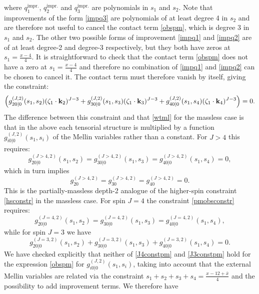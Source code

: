 \documentclass[11pt,a4paper]{article}
\begin{document}
where $q^{\text{impr.}}_1$, $q^{\text{impr.}}_2$ and $q^{\text{impr.}}_3$ are polynomials in $s_1$ and $s_2$. Note that improvements of the form \eqref{impq3} are  polynomials of at least degree 4 in $s_2$ and are therefore not useful to cancel the contact term \eqref{obspm}, which is degree 3 in $s_1$ and $s_2$. The other two possible forms of improvement \eqref{impq1} and \eqref{impq2} are of at least degree-2 and degree-3 respectively, but they both have zeros at $s_1=\tfrac{x-4}{4}$. It is straightforward to check that the contact term \eqref{obspm} does not have a zero at $s_1=\tfrac{x-4}{4}$ and therefore no combination of \eqref{impq1} and \eqref{impq2} can be chosen to cancel it. The contact term must therefore vanish by itself, giving the constraint:
\begin{equation}\label{pmobsconstr}
    \left(g^{\left(J,2\right)}_{20|0}(s_1,s_2)(\zeta_1\cdot\bold{k}_2)^{J-3}+g^{\left(J,2\right)}_{30|0}(s_1,s_3)(\zeta_1\cdot\bold{k}_3)^{J-3}+g^{\left(J,2\right)}_{40|0}(s_1,s_4)(\zeta_1\cdot\bold{k}_4)^{J-3}\right)=0.
\end{equation}
The difference between this constraint and that \eqref{wtml} for the massless case is that in the above each tensorial structure is multiplied by a function $g^{\left(J,2\right)}_{i0|0}(s_1,s_i)$ of the Mellin variables rather than a constant. For $J>4$ this requires:
\begin{equation}
    g^{\left(J>4,2\right)}_{20|0}(s_1,s_2)=g^{\left(J>4,2\right)}_{30|0}(s_1,s_3)=g^{\left(J>4,2\right)}_{40|0}(s_1,s_4)=0,
\end{equation}
which in turn implies
\begin{equation}
    g^{\left(J>4,2\right)}_{20}=g^{\left(J>4,2\right)}_{30}=g^{\left(J>4,2\right)}_{40}=0.
\end{equation}
This is the partially-massless depth-2 analogue of the higher-spin constraint \eqref{hsconstr} in the massless case. For spin $J=4$ the constraint \eqref{pmobsconstr} requires:
\begin{equation}\label{J4constpm}
    g^{\left(J=4,2\right)}_{20|0}(s_1,s_2)=g^{\left(J=4,2\right)}_{30|0}(s_1,s_3)=g^{\left(J=4,2\right)}_{40|0}(s_1,s_4),
\end{equation}
while for spin $J=3$ we have
\begin{equation}\label{J3constpm}
    g^{\left(J=3,2\right)}_{20|0}(s_1,s_2)+g^{\left(J=3,2\right)}_{30|0}(s_1,s_3)+g^{\left(J=3,2\right)}_{40|0}(s_1,s_4)=0.
\end{equation}
We have checked explicitly that neither of \eqref{J4constpm} and \eqref{J3constpm} hold for the expression \eqref{obspm} for $g^{\left(J,2\right)}_{i0|0}(s_1,s_i)$, taking into account that the external Mellin variables are related via the constraint ${s_1+s_2+s_3+s_4=\tfrac{x-12+{\bar x}}{4}}$ and the possibility to add improvement terms. We therefore have
\end{document}
